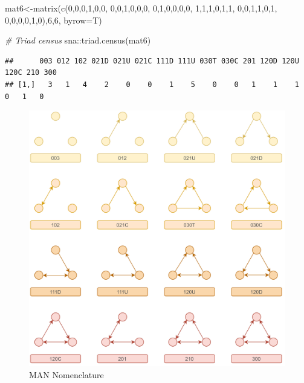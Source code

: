 \documentclass[
  notitlepage,
  onecolumn,
  openany]{book}
\newenvironment{Shaded}{\begin{snugshade}}{\end{snugshade}}
\newcommand{\AttributeTok}[1]{\textcolor[rgb]{0.77,0.63,0.00}{#1}}
\newcommand{\CommentTok}[1]{\textcolor[rgb]{0.56,0.35,0.01}{\textit{#1}}}
\newcommand{\DecValTok}[1]{\textcolor[rgb]{0.00,0.00,0.81}{#1}}
\newcommand{\FunctionTok}[1]{\textcolor[rgb]{0.00,0.00,0.00}{#1}}
\newcommand{\NormalTok}[1]{#1}
\newcommand{\OtherTok}[1]{\textcolor[rgb]{0.56,0.35,0.01}{#1}}
\newcommand{\SpecialCharTok}[1]{\textcolor[rgb]{0.00,0.00,0.00}{#1}}
\begin{document}
\begin{Shaded}
\begin{Highlighting}[]
\NormalTok{mat6}\OtherTok{\textless{}{-}}\FunctionTok{matrix}\NormalTok{(}\FunctionTok{c}\NormalTok{(}\DecValTok{0}\NormalTok{,}\DecValTok{0}\NormalTok{,}\DecValTok{0}\NormalTok{,}\DecValTok{1}\NormalTok{,}\DecValTok{0}\NormalTok{,}\DecValTok{0}\NormalTok{,}
               \DecValTok{0}\NormalTok{,}\DecValTok{0}\NormalTok{,}\DecValTok{1}\NormalTok{,}\DecValTok{0}\NormalTok{,}\DecValTok{0}\NormalTok{,}\DecValTok{0}\NormalTok{,}
               \DecValTok{0}\NormalTok{,}\DecValTok{1}\NormalTok{,}\DecValTok{0}\NormalTok{,}\DecValTok{0}\NormalTok{,}\DecValTok{0}\NormalTok{,}\DecValTok{0}\NormalTok{,}
               \DecValTok{1}\NormalTok{,}\DecValTok{1}\NormalTok{,}\DecValTok{1}\NormalTok{,}\DecValTok{0}\NormalTok{,}\DecValTok{1}\NormalTok{,}\DecValTok{1}\NormalTok{,}
               \DecValTok{0}\NormalTok{,}\DecValTok{0}\NormalTok{,}\DecValTok{1}\NormalTok{,}\DecValTok{1}\NormalTok{,}\DecValTok{0}\NormalTok{,}\DecValTok{1}\NormalTok{,}
               \DecValTok{0}\NormalTok{,}\DecValTok{0}\NormalTok{,}\DecValTok{0}\NormalTok{,}\DecValTok{0}\NormalTok{,}\DecValTok{1}\NormalTok{,}\DecValTok{0}\NormalTok{),}\DecValTok{6}\NormalTok{,}\DecValTok{6}\NormalTok{, }\AttributeTok{byrow=}\NormalTok{T)}

\CommentTok{\# Triad census}
\NormalTok{sna}\SpecialCharTok{::}\FunctionTok{triad.census}\NormalTok{(mat6)}
\end{Highlighting}
\end{Shaded}

\begin{verbatim}
##      003 012 102 021D 021U 021C 111D 111U 030T 030C 201 120D 120U 120C 210 300
## [1,]   3   1   4    2    0    0    1    5    0    0   1    1    1    0   1   0
\end{verbatim}

\begin{figure}[h!]

{\centering \includegraphics[width=0.8\linewidth]{images/12-Reciprocity and transitivity/MAN} 

}

\caption{MAN Nomenclature}\label{fig:unnamed-chunk-95}
\end{figure}
\end{document}

